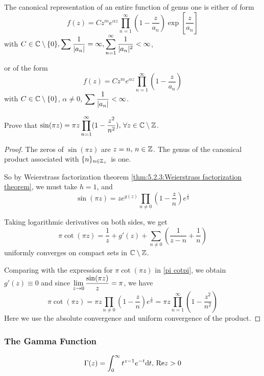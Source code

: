 \begin{example}
    The canonical representation of  an entire function of genus one is either of form 
    \begin{equation}
        f(z)=Cz^m e^{\alpha z}\prod_{n=1}^\infty(1-\frac{z}{a_n})\exp\left[\frac{z}{a_n}\right]
    \end{equation}
    with  $ C\in\mathbb C\setminus\{0\},\displaystyle\sum\frac{1}{|a_n|}=\infty,\sum_{n=1}^\infty\frac{1}{|a_n|^2}<\infty $,

    or of the form 
    \begin{equation}
        f(z)=Cz^m e^{\alpha z}\prod_{n=1}^\infty(1-\frac{z}{a_n})
    \end{equation}
    with  $ C\in\mathbb C\setminus\{0\} $, $ \alpha\neq 0 $,  $ \displaystyle\sum\frac{1}{|a_n|}<\infty $.   
\end{example}
\begin{example}
    Prove that  $ \sin(\pi z)=\pi z\displaystyle\prod_{n=1}^\infty(1-\frac{z^2}{n^2}),\,\forall z\in \mathbb C\setminus\mathbb Z $.\label{product expression of sin pi z}
\end{example}
\begin{proof}
    The zeros of  $ \sin(\pi z) $ are  $ z=n,\,n\in \mathbb Z $. The genus of the canonical product associated with  $ \{n\}_{n\in\mathbb Z_+} $ is one.
    
    So by Weierstrass factorization theorem \ref{thm:5.2.3:Weierstrass factorization theorem}, we must take  $ h=1 $, and 
    \begin{equation}
        \sin(\pi z)=z e^{g(z)}\prod_{n\neq 0}(1-\frac{z}{n})e^{\frac{z}{n}}
    \end{equation} 

    Taking logarithmic derivatives on both sides, we get 
    \begin{equation}
        \pi \cot(\pi z)=\frac{1}{z}+g'(z)+\sum_{n\neq 0}\left(\frac{1}{z-n}+\frac{1}{n}\right)
    \end{equation}
    uniformly converges on compact sets in  $ \mathbb C\setminus\mathbb Z $.
    
    Comparing with the expression for  $ \pi \cot(\pi z) $ in \eqref{pi cotpi}, we obtain  $ g'(z)\equiv 0 $ and since
    $ \displaystyle\lim_{z\to0} \frac{\sin(\pi z)}{z}=\pi $, we have 
    \begin{equation*}
        \pi \cot(\pi z)=\pi z\prod_{n\neq 0}(1-\frac{z}{n})e^{\frac{z}{n}}=\pi z\prod_{n=1}^\infty (1-\frac{z^2}{n^2})
    \end{equation*}
    Here we use the absolute convergence and uniform convergence of the product.
\end{proof}

\subsubsection{The Gamma Function}
\begin{equation}
    \name{$ \Gamma(z) $}=\int_0^\infty t^{z-1}e^{-t}\dd t,\,\Re z>0
\end{equation}